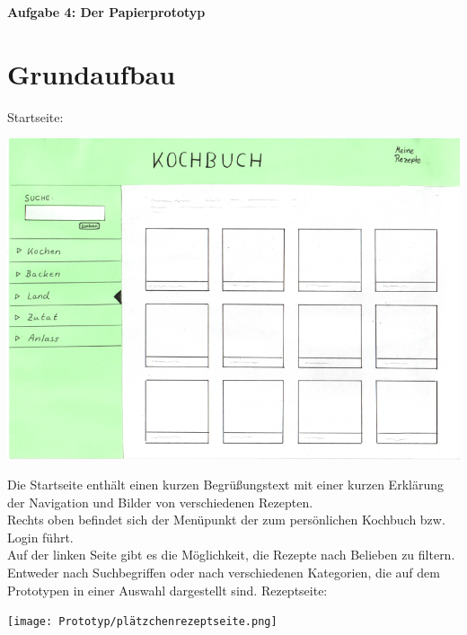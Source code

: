 \documentclass[parskip,10pt,abstracton]{scrartcl}
\renewcommand*{\maketitle}{%
	{\centering\LARGE\sffamily\bfseries Aufgabe 4: Der Papierprototyp \par}
	\vspace{3em}
}
\begin{document}
\maketitle



\section*{Grundaufbau}

Startseite:
\begin{center}
\includegraphics[scale=0.4]{Prototyp/home.png}
\end{center}

Die Startseite enthält einen kurzen Begrüßungstext mit einer kurzen Erklärung der Navigation und Bilder von verschiedenen Rezepten.\\
Rechts oben befindet sich der Menüpunkt der zum persönlichen Kochbuch bzw. Login führt.\\
Auf der linken Seite gibt es die Möglichkeit, die Rezepte nach Belieben zu filtern. Entweder nach Suchbegriffen oder nach verschiedenen Kategorien, die auf dem Prototypen in einer Auswahl dargestellt sind.
\newpage
Rezeptseite:
\begin{center}
\texttt{[image: Prototyp/plätzchenrezeptseite.png]}
\end{center}
\end{document}
